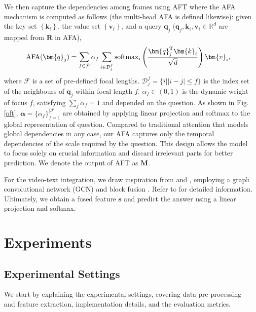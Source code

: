 We then  capture the dependencies among frames using AFT where the AFA mechanism
is computed as follows (the multi-head AFA is defined likewise): given the key set $\left\{\bm{k}_i\right\}$, the value set $\left\{\bm{v}_i\right\}$, and a query $\bm{q}_j$ ($\bm{q}_j,\bm{k}_i,\bm{v}_i \in \mathbb{R}^d$ are mapped from $\bm{R}$ in AFA), 
\begin{equation}
{\rm AFA}(\bm{q}_j)=\sum_{f\in \mathcal{F}}\alpha_f\sum_{i\in \mathcal{D}_j^f}{\rm softmax}_i\left(\frac{\bm{q}_j^\mathrm{T}\bm{k}_i}{\sqrt{d}}\right)\bm{v}_i,
\end{equation}
where $\mathcal{F}$ is a set of pre-defined focal lengths. $\mathcal{D}_j^f=\{i||i-j|\leq f\}$ is the index set of the neighbours of $\bm{q}_j$ within focal length $f$. $\alpha_f\in(0,1)$ is the dynamic weight of focus $f$, satisfying $\sum_f\alpha_f=1$ and depended on the question. As shown in Fig. \ref{aft},   $\bm{\alpha}=\{\alpha_f\}_{f=1}^\mathcal{|F|}$ are obtained by applying linear projection and softmax to the global representation of question.  
Compared to traditional attention that models global dependencies in any case, our AFA captures only the temporal dependencies of the scale required by the question. This design allows the model to focus solely on crucial information and discard irrelevant parts for better prediction. 
We denote the output of AFT as $\bm{M}$.

For the video-text integration, we draw inspiration from \citep{li2022invariant} and \citep{jiang2020reasoning}, employing a graph convolutional network (GCN) and block fusion \citep{ben2019block}. Refer to \citep{li2022invariant} for detailed information. Ultimately, we obtain a fused feature $\bm{s}$ and predict the answer using a linear projection and softmax.

\section{Experiments}
 

 
\subsection{Experimental Settings}
\label{feaext}

We start by explaining the experimental settings, covering data pre-processing and feature extraction, implementation details, and the evaluation metrics.

